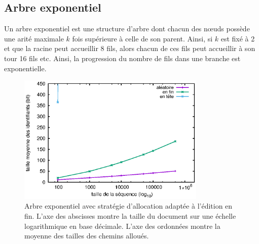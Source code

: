 

\subsection{Arbre exponentiel}
\label{repl:subsec:exponentialtree}

Un arbre exponentiel est une structure d'arbre dont chacun des nœuds possède une
arité maximale $k$ fois supérieure à celle de son parent. Ainsi, si $k$ est fixé
à 2 et que la racine peut accueillir 8 fils, alors chacun de ces fils peut
accueillir à son tour 16 fils etc. Ainsi, la progression du nombre de fils dans
une branche est exponentielle.


\begin{figure}
  \centering
  \includegraphics[width=0.8\textwidth]{img/lseq/double.eps}
  \caption{\label{repl:img:exponentialtree} Arbre exponentiel avec stratégie
    d'allocation adaptée à l'édition en fin. L'axe des abscisses montre la
    taille du document sur une échelle logarithmique en base décimale. L'axe des
    ordonnées montre la moyenne des tailles des chemins alloués.}
\end{figure}

